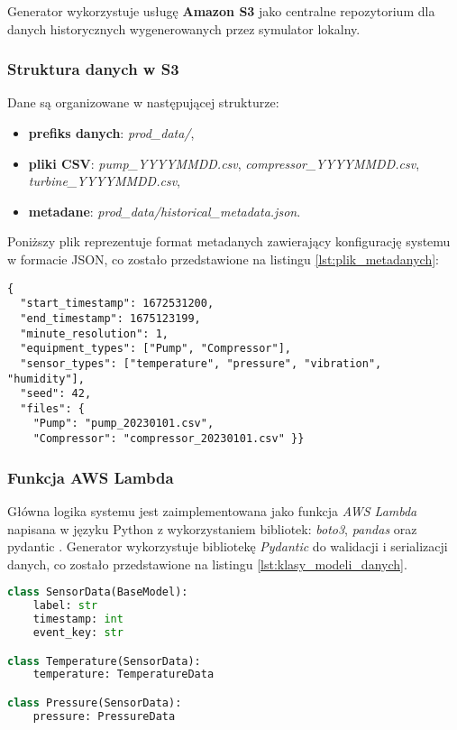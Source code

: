 Generator wykorzystuje usługę \textbf{Amazon S3} jako centralne repozytorium dla danych historycznych wygenerowanych przez symulator lokalny.

\subsubsection{Struktura danych w S3}

Dane są organizowane w następującej strukturze:

\begin{itemize}
    \item \textbf{prefiks danych}: \textit{prod\_data/},
    \item \textbf{pliki CSV}: \textit{pump\_YYYYMMDD.csv}, \textit{compressor\_YYYYMMDD.csv}, \textit{turbine\_YYYYMMDD.csv},
    \item \textbf{metadane}: \textit{prod\_data/historical\_metadata.json}.
\end{itemize}

\vspace{0.3em}

Poniższy plik reprezentuje format metadanych zawierający konfigurację systemu w formacie JSON, co zostało przedstawione na listingu \ref{lst:plik_metadanych}:

\begin{lstlisting}[caption=Przykładowy plik metadanych, label={lst:plik_metadanych}]
{
  "start_timestamp": 1672531200,
  "end_timestamp": 1675123199,
  "minute_resolution": 1,
  "equipment_types": ["Pump", "Compressor"],
  "sensor_types": ["temperature", "pressure", "vibration", "humidity"],
  "seed": 42,
  "files": {
    "Pump": "pump_20230101.csv",
    "Compressor": "compressor_20230101.csv" }}
\end{lstlisting}

\newpage

\subsubsection{Funkcja AWS Lambda}
\label{subsec:aws_lambda}

Główna logika systemu jest zaimplementowana jako funkcja \textit{AWS Lambda} napisana w języku Python z wykorzystaniem bibliotek: \textit{boto3}, \textit{pandas} oraz pydantic \cite{pydantic_docs}. Generator wykorzystuje bibliotekę \textit{Pydantic} do walidacji i serializacji danych, co zostało przedstawione na listingu \ref{lst:klasy_modeli_danych}.

\begin{lstlisting}[language=Python, caption=Klasy modeli danych, label={lst:klasy_modeli_danych}]
class SensorData(BaseModel):
    label: str
    timestamp: int
    event_key: str

class Temperature(SensorData):
    temperature: TemperatureData

class Pressure(SensorData):
    pressure: PressureData
\end{lstlisting}


